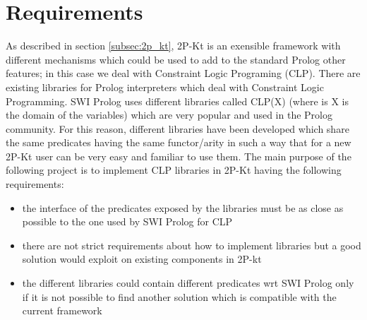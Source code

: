 \section{Requirements}\label{sec:requirements_clp}

As described in section \ref{subsec:2p_kt}, 2P-Kt is an exensible framework with different mechanisms
which could be used to add to the standard Prolog other features; in this case we deal with Constraint Logic Programing (CLP).\newline
There are existing libraries for Prolog interpreters which deal with Constraint Logic Programming. SWI Prolog uses different libraries
called CLP(X) (where is X is the domain of the variables) which are very popular and used in the Prolog community. For this reason, different libraries
have been developed which share the same predicates having the same functor/arity in such a way that for a new 2P-Kt user can be very easy and familiar to use them.\newline
The main purpose of the following project is to implement CLP libraries in 2P-Kt having the following requirements:
\begin{itemize}
    \item the interface of the predicates exposed by the libraries must be as close as possible to the one used by SWI Prolog for CLP
    \item there are not strict requirements about how to implement libraries but a good solution would exploit on existing components in 2P-kt
    \item the different libraries could contain different predicates wrt SWI Prolog only if it is not possible to find another solution which is compatible with the current framework
\end{itemize}

